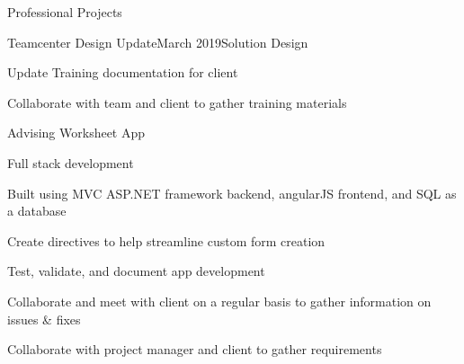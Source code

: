 \documentclass{resume} %
\begin{document}
\begin{rSection}{Professional Projects}
    \begin{rSubsection}{Teamcenter Design Update}{March 2019}{Solution Design}{}
        \item Update Training documentation for client
        \item Collaborate with team and client to gather training materials
    \end{rSubsection}

    \begin{rSubsection}{Advising Worksheet App}{}{}{}
        \item Full stack development 
        \item Built using MVC ASP.NET framework backend, angularJS frontend, and SQL as a database
        \item Create directives to help streamline custom form creation
        \item Test, validate, and document app development
        \item Collaborate and meet with client on a regular basis to gather information on issues \& fixes
        \item Collaborate with project manager and client to gather requirements
    \end{rSubsection}
    
\end{rSection}
\end{document}
